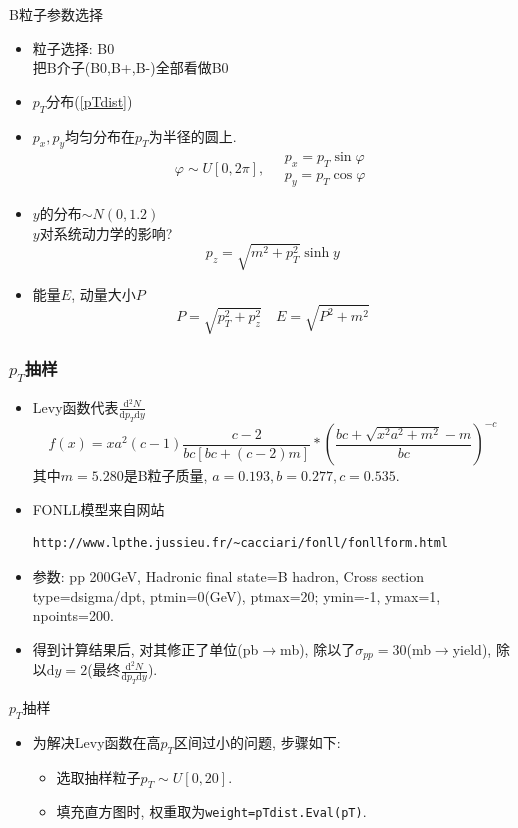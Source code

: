\documentclass{beamer}
\newcommand{\rd}{\mathrm{d}}
\newcommand{\eddon}[2]{\frac{\mathrm{d}{#1}}{\mathrm{d}{#2}}}
\newcommand{\pare}[1]{\left(#1\right)}
\begin{document}
\begin{frame}{B粒子参数选择}
	\begin{itemize}
	\item 粒子选择: B0\\
	{\kaishu 把B介子(B0,B+,B-)全部看做B0}
		\item $p_T$分布(\ref{pTdist})\\
		\item $p_x, p_y$均匀分布在$p_T$为半径的圆上.
		\[\varphi\sim U[0,2\pi],\quad \begin{array}{l}
			p_x = p_T\sin\varphi\\
			p_y = p_T\cos\varphi
		\end{array} \]
		\item $y$的分布$\sim N(0, 1.2)$\\
		{\kaishu $y$对系统动力学的影响?}
		\[p_z = \sqrt{m^2+p_T^2}\sinh y \]
		\item 能量$E$, 动量大小$P$
		\[P = \sqrt{p_T^2+p_z^2} \quad E = \sqrt{P^2+m^2} \]
	\end{itemize}
\end{frame}

\begin{frame}[fragile]
\frametitle{\texorpdfstring{$p_T$}{pT}抽样}
\begin{itemize}
	\item Levy函数{\kaishu 代表$\displaystyle\eddon{^2
	N}{p_T\rd y}$}
	\[f(x) = xa^2(c-1)\frac{c-2}{bc[bc+(c-2)m]}*\pare{\frac{bc + \sqrt{x^2a^2+m^2} -m}{bc}}^{-c} \]
	其中$m=5.280$是B粒子质量, $a = 0.193,b=0.277,c=0.535$.
	\item FONLL模型来自网站
\begin{lstlisting}
http://www.lpthe.jussieu.fr/~cacciari/fonll/fonllform.html
\end{lstlisting}
	\item 参数: pp 200GeV, Hadronic final state=B hadron, Cross section type=dsigma/dpt, ptmin=0(GeV), ptmax=20; ymin=-1, ymax=1, npoints=200.
	\item 得到计算结果后, 对其修正了单位(pb$\to$mb), 除以了$\sigma_{pp}=30$(mb$\to$yield), 除以$\rd y=2$(最终$\eddon{^2N}{p_T\rd y}$).
\end{itemize}

\end{frame}
\begin{frame}{\texorpdfstring{$p_T$}{pT}抽样}
	\label{pTdist}
	\begin{itemize}
	\item 为解决Levy函数在高$p_T$区间过小的问题, 步骤如下:
	\begin{itemize}
	\item 选取抽样粒子$p_T\sim U[0,20]$.
	\item 填充直方图时, 权重取为\texttt{weight=pTdist.Eval(pT)}.
	\end{itemize}
	\end{itemize}
\end{frame}
\end{document}
